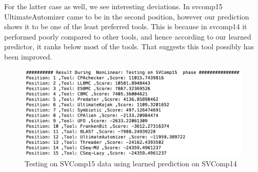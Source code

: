  For the latter case as well, we see interesting deviations. In svcomp15 UltimateAutomizer came to be in the second position, however our prediction shows it to be one of the least preferred tools. This is because in svcomp14 it performed poorly compared to other tools, and hence according to our learned predictor, it ranks below most of the tools. That suggests this tool possibly has been improved.
 
\begin{figure}
	\label{fig:test_nonlin_15}
	\centering
	\includegraphics[width = 4.5in]{figures/test15.PNG}
	\caption{Testing on SVComp15 data using learned prediction on SVComp14}
\end{figure} 
 
